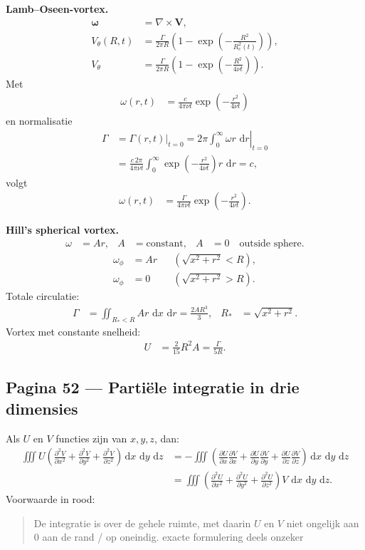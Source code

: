 \documentclass[11pt]{article}
\newcommand{\dd}{\,\mathrm{d}}
\newcommand{\pd}[2]{\frac{\partial #1}{\partial #2}}
\newcommand{\vect}[1]{\mathbf{#1}}
\newcommand{\onzeker}[1]{\textcolor{red!70!black}{#1}}
\begin{document}
\textbf{Lamb--Oseen-vortex.}
\begin{align*}
\bm{\omega}&=\nabla\times\vect{V},\\
V_\theta(R,t)
&=
\frac{\Gamma}{2\pi R}
\left(1-\exp\left(-\frac{R^2}{R_c^2(t)}\right)\right),\\
V_\theta
&=
\frac{\Gamma}{2\pi R}
\left(1-\exp\left(-\frac{R^2}{4\nu t}\right)\right).
\end{align*}
Met
\begin{align*}
\omega(r,t)
&=
\frac{c}{4\pi\nu t}
\exp\left(-\frac{r^2}{4\nu t}\right)
\end{align*}
en normalisatie
\begin{align*}
\Gamma
&=
\left.\Gamma(r,t)\right|_{t=0}
=
\left.2\pi\int_0^\infty \omega r\,\dd r\right|_{t=0}\\
&=
\frac{c\,2\pi}{4\pi\nu t}
\int_0^\infty
\exp\left(-\frac{r^2}{4\nu t}\right)r\,\dd r
=
c,
\end{align*}
volgt
\begin{align*}
\omega(r,t)
&=
\frac{\Gamma}{4\pi\nu t}
\exp\left(-\frac{r^2}{4\nu t}\right).
\end{align*}

\textbf{Hill's spherical vortex.}
\begin{align*}
\omega &= Ar,
&
A&=\text{constant},
&
A&=0\quad \text{outside sphere}.
\end{align*}
\begin{align*}
\omega_\phi &= Ar
&&\left(\sqrt{x^2+r^2}<R\right),\\
\omega_\phi &= 0
&&\left(\sqrt{x^2+r^2}>R\right).
\end{align*}
Totale circulatie:
\begin{align*}
\Gamma
&=
\iint_{R_\ast<R} Ar\,\dd x\,\dd r
=
\frac{2AR^3}{3},
&
R_\ast&=\sqrt{x^2+r^2}.
\end{align*}
Vortex met constante snelheid:
\begin{align*}
U
&=
\frac{2}{15}R^2A
=
\frac{\Gamma}{5R}.
\end{align*}

\subsection*{Pagina 52 --- Partiële integratie in drie dimensies}

Als $U$ en $V$ functies zijn van $x,y,z$, dan:
\begin{align*}
\iiint U\left(
\pd{^2 V}{x^2}
+
\pd{^2 V}{y^2}
+
\pd{^2 V}{z^2}
\right)\dd x\,\dd y\,\dd z
&=
-\iiint
\left(
\pd{U}{x}\pd{V}{x}
+
\pd{U}{y}\pd{V}{y}
+
\pd{U}{z}\pd{V}{z}
\right)
\dd x\,\dd y\,\dd z\\
&=
\iiint
\left(
\pd{^2 U}{x^2}
+
\pd{^2 U}{y^2}
+
\pd{^2 U}{z^2}
\right)
V\,\dd x\,\dd y\,\dd z.
\end{align*}
Voorwaarde in rood:
\begin{quote}
De integratie is over de gehele ruimte, met daarin $U$ en $V$ niet ongelijk aan $0$ aan de rand / op oneindig. \onzeker{exacte formulering deels onzeker}
\end{quote}
\end{document}

